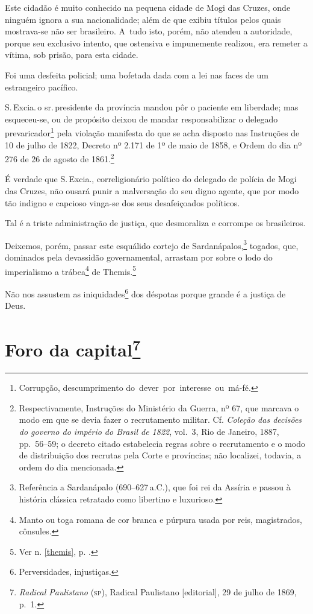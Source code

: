 Este cidadão é muito conhecido na pequena cidade de Mogi das Cruzes,
onde ninguém ignora a sua nacionalidade; além de que exibiu títulos
pelos quais mostrava-se não ser brasileiro. A~tudo isto, porém, não
atendeu a autoridade, porque seu exclusivo intento, que ostensiva e
impunemente realizou, era remeter a vítima, sob prisão, para esta
cidade.

Foi uma desfeita policial; uma bofetada dada com a lei nas faces de um
estrangeiro pacífico.

S.\,Excia.\,o sr.\,presidente da província mandou pôr o paciente em
liberdade; mas esqueceu-se, ou de propósito deixou de mandar
responsabilizar o delegado prevaricador\footnote{Corrupção,
  descumprimento do~dever~por~interesse~ou~má-fé.} pela violação
manifesta do que se acha disposto nas Instruções de 10 de julho de 1822,
Decreto nº 2.171 de 1º de maio de 1858, e Ordem do dia nº 276 de 26 de
agosto de 1861.\footnote{Respectivamente, Instruções do Ministério da
  Guerra, nº 67, que marcava o modo em que se devia fazer o recrutamento
  militar. Cf. \emph{Coleção das decisões do governo do império do
  Brasil de 1822}, vol.~3, Rio de Janeiro, 1887, pp.~56--59; o decreto
  citado estabelecia regras sobre o recrutamento e o modo de
  distribuição dos recrutas pela Corte e províncias; não localizei,
  todavia, a ordem do dia mencionada.}

É verdade que S.\,Excia., correligionário político do delegado de polícia
de Mogi das Cruzes, não ousará punir a malversação do seu digno agente,
que por modo tão indigno e capcioso vinga-se dos seus desafeiçoados
políticos.

Tal é a triste administração de justiça, que desmoraliza e corrompe os
brasileiros.

Deixemos, porém, passar este esquálido cortejo de
Sardanápalos,\footnote{Referência a Sardanápalo (690--627\,a.C.), que
  foi rei da Assíria e passou à história clássica retratado como
  libertino e luxurioso.} togados, que, dominados pela devassidão
governamental, arrastam por sobre o lodo do imperialismo a
trábea\footnote{Manto ou toga romana de cor branca e púrpura usada por
  reis, magistrados, cônsules.} de Themis.\footnote{Ver n. \ref{themis}, p. \pageref{themis}.}

Não nos assustem as iniquidades\footnote{Perversidades, injustiças.}
dos déspotas porque grande é a justiça de Deus.

\chapter{Foro da capital\footnote{\emph{Radical Paulistano} (\textsc{sp}), Radical Paulistano {[}editorial{]}, 29 de julho de 1869, p.~1.}}

